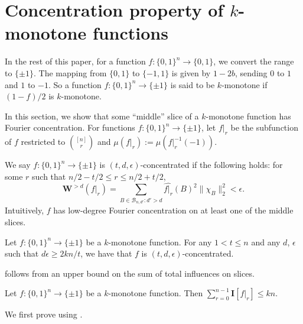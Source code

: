 \documentclass{toc}
\newcommand{\W}{\mathbf{W}}
\newcommand{\I}{\mathbf{I}}
\newcommand{\warn}[1]{#1}
\begin{document}
\section{Concentration property of $k$-monotone functions}
\warn{In the rest of this paper, for a function $f:\{0,1\}^n\rightarrow\{0,1\}$, we convert the range to $\{\pm 1\}$. 
The mapping from $\{0,1\}$ to $\{-1,1\}$ is given by $1-2b$, sending $0$ to $1$ and $1$ to $-1$. So a function $f:\{0,1\}^n\rightarrow\{\pm 1\}$ is said to be $k$-monotone if $(1-f)/2$ is $k$-monotone.}

In this section, we show 
that %
some ``middle'' slice
of a $k$-monotone function has Fourier concentration. 
For functions $f:\{0,1\}^n\rightarrow\{\pm1\}$, let $f|_r$ be the subfunction of $f$ restricted to %
$\binom{[n]}{r}$ %
and $\mu(f|_r):=\mu(f|_r^{-1}(-1))$.

\begin{definition}
We say $f:\{0,1\}^n\rightarrow\{\pm1\}$ is $(t,d,\epsilon)$-concentrated if the following holds: for some $r$ such that $n/2-t/2\leq r\leq n/2+t/2$,
%
\begin{equation} %
\W^{>d}(f|_r)=\sum_{B\in \mathcal{B}_{n,d'}: d'> d }\widehat{f|_r}(B)^2\| \chi_B\|_2^2 < \epsilon.
%
\end{equation} %
\warn{Intuitively, $f$ has low-degree Fourier concentration on at least one of the middle slices.}
\end{definition}

\begin{lemma} \label{lm:main}
Let $f:\{0,1\}^n\rightarrow\{\pm1\}$ be a $k$-monotone function.
For any $1<t \leq n$ and any $d$, $\epsilon$ such that $d\epsilon \geq 2kn/t$, 
we have that %
$f$ is $(t, d, \epsilon)$-concentrated.
\end{lemma}

 follows from an upper bound on the sum of total influences on slices.
\begin{proposition}\label{prop:main}
Let $f:\{0,1\}^n\rightarrow\{\pm1\}$ be a $k$-monotone function. Then $\sum_{r=0}^{n-1} \I[f|_r]\leq kn$.
\end{proposition}


We first prove  using .
\end{document}
